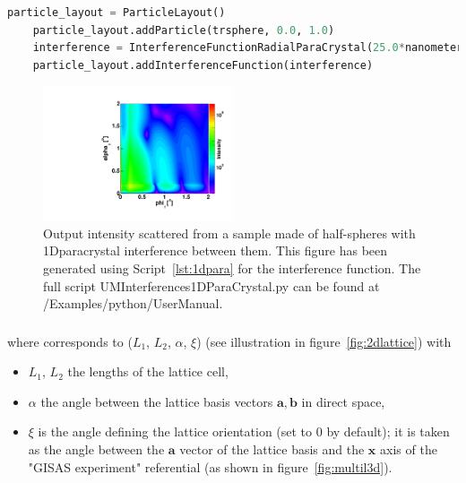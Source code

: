 \begin{lstlisting}[language=python, style=eclipseboxed,numbers=none,nolol,caption={\Code{Python} script to define the 1D paracrystal interference function between half-spheres, where \Code{trsphere} is of type \Code{Particle}.},label={lst:1dpara}]
    particle_layout = ParticleLayout()
    particle_layout.addParticle(trsphere, 0.0, 1.0)
    interference = InterferenceFunctionRadialParaCrystal(25.0*nanometer, 7*nanometer, 1e3*nanometer)
    particle_layout.addInterferenceFunction(interference)
\end{lstlisting}

\begin{figure}[h]
\begin{center}
\includegraphics[width=0.5\textwidth]{Figures/HSphere_1DDL}
\end{center}
\caption{Output intensity scattered from a sample made of half-spheres with 1Dparacrystal interference between them. This figure has been generated using Script~\ref{lst:1dpara} for the interference function. The full script UMInterferences1DParaCrystal.py can be found at /Examples/python/UserManual.}
\label{fig:1ddl}
\end{figure}

\FloatBarrier

\newpage{\cleardoublepage}
\subsubsection{  } \label{paragraph2dlatt}
where  corresponds to ($L_1$, $L_2$, $\alpha$, $\xi$)  (see illustration in figure~\ref{fig:2dlattice}) with 
\begin{itemize}
\item[]$L_1$, $L_2$ the lengths of the lattice cell, 
\item[]$\alpha$ the angle between the lattice basis vectors $\mathbf{a}, \mathbf{b}$ in direct space,
\item[] $\xi$ is the angle defining the lattice orientation (set to $0$ by default); it is taken as the angle between the $\mathbf{a}$ vector of the lattice basis and the $\mathbf{x}$ axis of the "GISAS experiment" referential (as shown in figure~\ref{fig:multil3d}).
\end{itemize}

